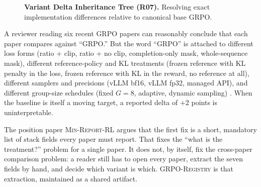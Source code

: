 \documentclass[11pt]{article}
\newcommand{\minreport}{\textsc{Min-Report-RL}}
\newcommand{\grpo}{\textsc{GRPO}}
\newcommand{\grpoReg}{\textsc{GRPO-Registry}}
\begin{document}
\begin{figure}[htbp]
\centering
{}
\caption{\textbf{Variant Delta Inheritance Tree (R07).} Resolving exact implementation differences relative to canonical base GRPO.}
\label{fig:grpo_registry_inheritance}
\end{figure}

A reviewer reading six recent \grpo{} papers can reasonably conclude that each
paper compares against ``GRPO.'' But the word ``GRPO'' is attached to different
loss forms (ratio + clip, ratio + no clip, completion-only mask,
whole-sequence mask), different reference-policy and KL treatments (frozen
reference with KL penalty in the loss, frozen reference with KL in the reward,
no reference at all), different samplers and precisions (vLLM bf16, vLLM fp32,
managed API), and different group-size schedules (fixed $G=8$, adaptive,
dynamic sampling) \cite{zvfaudit2026,yu2025dapo,qwen2025gspo,tong2025drgrpo,
hong2025mgrpo}. When the baseline is itself a moving target, a reported delta of
$+2$ points is uninterpretable.

The position paper \minreport{} \cite{minreportrl2026} argues that the first
fix is a short, mandatory list of stack fields every paper must report. That
fixes the ``what is the treatment?'' problem for a single paper. It does not,
by itself, fix the cross-paper comparison problem: a reader still has to open
every paper, extract the seven fields by hand, and decide which variant is
which. \grpoReg{} is that extraction, maintained as a shared artifact.
\end{document}
